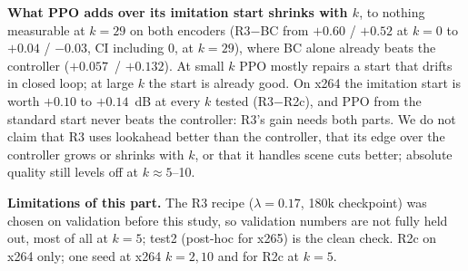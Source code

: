 \textbf{What PPO adds over its imitation start shrinks with $k$}, to nothing measurable at $k{=}29$ on both encoders
(R3$-$BC from $+0.60$ / $+0.52$ at $k{=}0$ to $+0.04$ / $-0.03$, CI including 0, at $k{=}29$), where BC alone already
beats the controller ($+0.057$\sig\ / $+0.132$\sig). At small $k$ PPO mostly repairs a start that drifts in closed loop;
at large $k$ the start is already good. On x264 the imitation start is worth $+0.10$ to $+0.14$~dB at every $k$ tested
(R3$-$R2c), and PPO from the standard start never beats the controller: R3's gain needs both parts. We do not claim
that R3 uses lookahead better than the controller, that its edge over the controller grows or shrinks with $k$, or that
it handles scene cuts better; absolute quality still levels off at $k\approx5$--10.

\textbf{Limitations of this part.} The R3 recipe ($\lambda{=}0.17$, 180k checkpoint) was chosen on validation before
this study, so validation numbers are not fully held out, most of all at $k{=}5$; test2 (post-hoc for x265) is the
clean check. R2c on x264 only; one seed at x264 $k{=}2,10$ and for R2c at $k{=}5$.
